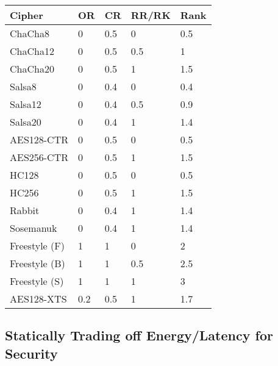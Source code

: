 \begin{table}[]
   \begin{tabular}{@{}lllll@{}}
   \toprule
   \textbf{Cipher} & \textbf{OR} & \textbf{CR} & \textbf{RR/RK} & \textbf{Rank} \\ \midrule
   ChaCha8         & 0           & 0.5         & 0              & 0.5           \\
   ChaCha12        & 0           & 0.5         & 0.5            & 1             \\
   ChaCha20        & 0           & 0.5         & 1              & 1.5           \\
   Salsa8          & 0           & 0.4         & 0              & 0.4           \\
   Salsa12         & 0           & 0.4         & 0.5            & 0.9           \\
   Salsa20         & 0           & 0.4         & 1              & 1.4           \\
   AES128-CTR      & 0           & 0.5         & 0              & 0.5           \\
   AES256-CTR      & 0           & 0.5         & 1              & 1.5           \\
   HC128           & 0           & 0.5         & 0              & 0.5           \\
   HC256           & 0           & 0.5         & 1              & 1.5           \\
   Rabbit          & 0           & 0.4         & 1              & 1.4           \\
   Sosemanuk       & 0           & 0.4         & 1              & 1.4           \\
   Freestyle (F)   & 1           & 1           & 0              & 2             \\
   Freestyle (B)   & 1           & 1           & 0.5            & 2.5           \\
   Freestyle (S)   & 1           & 1           & 1              & 3             \\
   AES128-XTS      & 0.2         & 0.5         & 1              & 1.7
   \end{tabular}
   \caption{}
   \label{tbl:security-quant}
\end{table}

\subsection{Statically Trading off Energy/Latency for Security}

